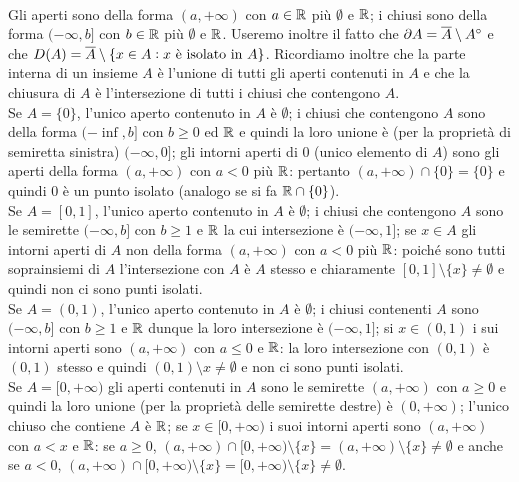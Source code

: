 \\
Gli aperti sono della forma $ (a, +\infty) $ con $ a \in \mathbb{R} $ più $ \emptyset $ e $ \mathbb{R} $; i chiusi sono della forma $ (-\infty, b] $ con $ b \in \mathbb{R} $ più $ \emptyset $ e $ \mathbb{R} $. Useremo inoltre il fatto che $ \partial{A} = \overline{A} \setminus {A}^{\circ} $ e che $ D{(A)} = \overline{A} \setminus \{x \in A : x \text{ è isolato in } A\} $. Ricordiamo inoltre che la parte interna di un insieme $ A $ è l'unione di tutti gli aperti contenuti in $ A $ e che la chiusura di $ A $ è l'intersezione di tutti i chiusi che contengono $ A $.\\
Se $ A = \{0\} $, l'unico aperto contenuto in $ A $ è $ \emptyset $; i chiusi che contengono $ A $ sono della forma $ (-\inf, b] $ con $ b \geq 0 $ ed $ \mathbb{R} $ e quindi la loro unione è (per la proprietà di semiretta sinistra) $ (-\infty, 0] $; gli intorni aperti di 0 (unico elemento di $ A $) sono gli aperti della forma $ (a, +\infty) $ con $ a < 0 $ più $ \mathbb{R} $: pertanto $ (a, +\infty) \cap \{0\} = \{0\} $ e quindi $ 0 $ è un punto isolato (analogo se si fa $ \mathbb{R} \cap \{0\} $). \\
Se $ A = [0, 1] $, l'unico aperto contenuto in $ A $ è $ \emptyset $; i chiusi che contengono $ A $ sono le semirette $ (-\infty, b] $ con $ b \geq 1 $ e $ \mathbb{R} $ la cui intersezione è $ (-\infty, 1] $; se $ x \in A $ gli intorni aperti di $ A $ non della forma $ (a, +\infty) $ con $ a < 0 $ più $ \mathbb{R} $: poiché sono tutti soprainsiemi di $ A $ l'intersezione con $ A $ è $ A $ stesso e chiaramente $ [0, 1] \setminus \{x\} \neq \emptyset $ e quindi non ci sono punti isolati.\\
Se $ A = (0, 1) $, l'unico aperto contenuto in $ A $ è $ \emptyset $; i chiusi contenenti $ A $ sono $ (-\infty, b] $ con $ b \geq 1 $ e $ \mathbb{R} $ dunque la loro intersezione è $ (-\infty, 1] $; si $ x \in (0, 1) $ i sui intorni aperti sono $ (a, +\infty) $ con $ a \leq 0 $ e $ \mathbb{R} $: la loro intersezione con $ (0, 1) $ è $ (0, 1) $ stesso e quindi $ (0, 1) \setminus x \neq \emptyset $ e non ci sono punti isolati. \\
Se $ A = [0, +\infty) $ gli aperti contenuti in $ A $ sono le semirette $ (a, +\infty) $ con $ a \geq 0 $ e quindi la loro unione (per la proprietà delle semirette destre) è $ (0, +\infty) $; l'unico chiuso che contiene $ A $ è $ \mathbb{R} $; se $ x \in [0, +\infty) $ i suoi intorni aperti sono $ (a, +\infty) $ con $ a < x $ e $ \mathbb{R} $: se $ a \geq 0 $, $ (a, +\infty) \cap [0, +\infty) \setminus \{x\} = (a, +\infty) \setminus \{x\} \neq \emptyset $ e anche se $ a < 0 $, $ (a, +\infty) \cap [0, +\infty) \setminus \{x\} = [0, +\infty) \setminus \{x\} \neq \emptyset $. \\
